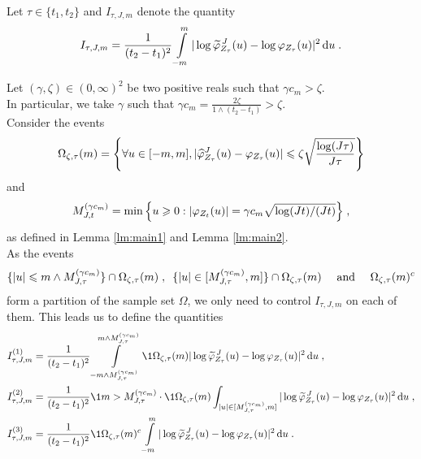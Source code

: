 Let $\tau \in \{t_1, t_2\}$ and $I_{\tau, J, m}$ denote the quantity 
	\begin{equation*}
	I_{\tau, J, m} = \frac{1}{(t_2 - t_1)^2} \int\limits_{-m}^m | \log \widetilde \varphi_{Z_{\tau}}^{\, J} (u) - \log\varphi_{Z_{\tau}} (u)|^2 \, \mathrm du
	\; .
	\end{equation*}
	
	
Let $(\gamma, \zeta) \in (0, \infty)^2$ be two positive reals such that $\gamma c_m > \zeta$. \\
In particular,  we take $\gamma$ such that $\gamma c_m = \frac{2 \zeta}{1 \wedge (t_2 - t_1)} > \zeta$. \\


Consider the events 
    \begin{equation*}
        \Omega_{\zeta, \tau}(m) = \Bigg\{ 
            \forall u \in [-m, m], |\widehat \varphi^J_{Z_{\tau}}(u) - \varphi_{Z_{\tau}}(u)|
            \leqslant
            \zeta \sqrt{\frac{\log(J \tau)}{J \tau}}
        \Bigg\}
    \end{equation*}
and
    \begin{equation*}
        M_{J, t}^{(\gamma c_m)} = \min \Big\{ u \geqslant 0: |\varphi_{Z_t}(u)| = \gamma c_m \sqrt{\log(Jt)/(Jt)} \Big\}
        \; ,
    \end{equation*}
as defined in Lemma \ref{lm:main1} and Lemma \ref{lm:main2}. \\
As the events
	\begin{equation*}
    \{ |u| \leqslant m \wedge M_{J, \tau}^{(\gamma c_m)} \} \cap \Omega_{\zeta, \tau}(m)
    \; , \enspace
    \{ |u| \in [M_{J, \tau}^{(\gamma c_m)}, m] \} \cap \Omega_{\zeta, \tau}(m)
    \quad \text{ and } \quad
    \Omega_{\zeta, \tau}(m)^c
	\end{equation*}
form a partition of the sample set $\Omega$, we only need to control $I_{\tau, J, m}$ on each of them. This leads us to define the quantities 
	\begin{subequations}
	\begin{align*}
		I_{\tau, J, m}^{(1)} 
		&= \frac{1}{(t_2 - t_1)^2}
		\int\limits_{-m \wedge M_{J, \tau}^{(\gamma c_m)}}^{m \wedge M_{J, \tau}^{(\gamma c_m)}} \1{\Omega_{\zeta, \tau}(m)}
		|\log \tilde \varphi_{Z_{\tau}}^{\, J}  (u) - \log\varphi_{Z_{\tau}} (u)|^2 \du
		\eqfinv
	    \\
		I_{\tau, J, m}^{(2)}
		&= \frac{1}{(t_2 - t_1)^2}
		\1{m > M_{J, \tau}^{(\gamma c_m)}} \cdot \1{\Omega_{\zeta, \tau}(m)} \int_{|u| \in [M_{J, \tau}^{(\gamma c_m)}, m]} |\log \tilde \varphi_{Z_{\tau}}^{\, J}  (u) - \log\varphi_{Z_{\tau}} (u)|^2 \du 
		\eqfinv
		\\
		I_{\tau, J, m}^{(3)} 
		&= \frac{1}{(t_2 - t_1)^2}
		\1{\Omega_{\zeta, \tau}(m)^c}  \int\limits_{-m}^m | \log \tilde \varphi_{Z_{\tau}}^{\, J}  (u) - \log\varphi_{Z_{\tau}} (u)|^2 \du
		\eqfinp
	\end{align*}
	\end{subequations}


